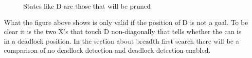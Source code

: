\documentclass[../../main.tex]{subfiles}
\begin{document}
\begin{figure}[h]
	\centering

	\caption{States like D are those that will be pruned}
	\label{fig:basic_deadlock_detection}
\end{figure}

What the figure above shows is only valid if the position of D is not a goal. To be clear it is the two X's that touch D non-diagonally that tells whether the can is in a deadlock position. In the section about breadth first search there will be a comparison of no deadlock detection and deadlock detection enabled.
\end{document}
